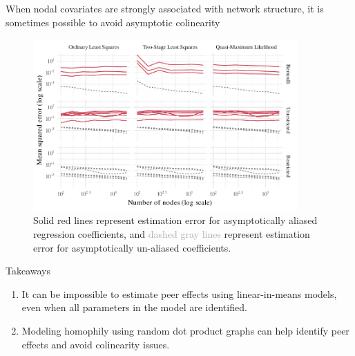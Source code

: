 \documentclass[final]{beamer}
\newlength{\colwidth}
\begin{document}
\begin{frame}[t]
\begin{columns}[t]
\begin{column}{\colwidth}
\begin{block}{When nodal covariates are strongly associated with network structure, it is sometimes possible to avoid asymptotic colinearity}
                \begin{figure}
                    \centering
                    \includegraphics[width=0.9\textwidth]{./figures/simulations/biometrika-mse-all.pdf}
                    \caption{\textcolor{Mahogany}{Solid red lines} represent estimation error for asymptotically aliased regression coefficients, and \textcolor{darkgray}{dashed gray lines} represent estimation error for asymptotically un-aliased coefficients.}
                \end{figure}

            \end{block}

            \begin{alertblock}{Takeaways}
                \vspace{4mm}
                \begin{enumerate}
                    \setlength\itemsep{1.5em}
                    \item It can be impossible to estimate peer effects using linear-in-means models, even when all parameters in the model are identified.
                    \item Modeling homophily using random dot product graphs can help identify peer effects and avoid colinearity issues.
                \end{enumerate}
            \end{alertblock}


\end{column}
\end{columns}
\end{frame}
\end{document}
